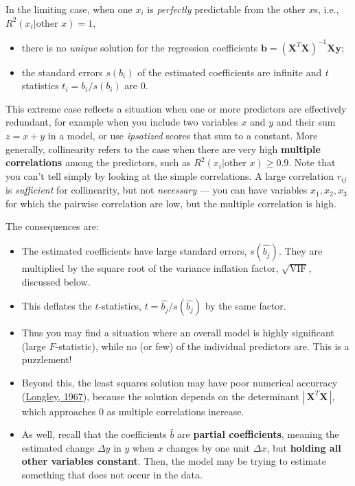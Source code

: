 \documentclass[
  letterpaper,
  10pt,
  krantz2]{krantz}
\providecommand{\tightlist}{%
  \setlength{\itemsep}{0pt}\setlength{\parskip}{0pt}}\usepackage{longtable,booktabs,array}
\begin{document}
In the limiting case, when one \(x_i\) is \emph{perfectly} predictable
from the other \(x\)s, i.e., \(R^2 (x_i | \text{other }x) = 1\),

\begin{itemize}
\tightlist
\item
  there is no \emph{unique} solution for the regression coefficients
  \(\mathbf{b} = (\mathbf{X}^T \mathbf{X})^{-1} \mathbf{X} \mathbf{y}\);
\item
  the standard errors \(s (b_i)\) of the estimated coefficients are
  infinite and \emph{t} statistics \(t_i = b_i / s (b_i)\) are 0.
\end{itemize}

This extreme case reflects a situation when one or more predictors are
effectively redundant, for example when you include two variables \(x\)
and \(y\) and their sum \(z = x + y\) in a model, or use
\emph{ipsatized} scores that sum to a constant. More generally,
collinearity refers to the case when there are very high
\textbf{multiple correlations} among the predictors, such as
\(R^2 (x_i | \text{other }x) \ge 0.9\). Note that you can't tell simply
by looking at the simple correlations. A large correlation \(r_{ij}\) is
\emph{sufficient} for collinearity, but not \emph{necessary} --- you can
have variables \(x_1, x_2, x_3\) for which the pairwise correlation are
low, but the multiple correlation is high.

The consequences are:

\begin{itemize}
\tightlist
\item
  The estimated coefficients have large standard errors,
  \(s(\hat{b_j})\). They are multiplied by the square root of the
  variance inflation factor, \(\sqrt{\text{VIF}}\), discussed below.
\item
  This deflates the \(t\)-statistics, \(t = \hat{b_j} / s(\hat{b_j})\)
  by the same factor.
\item
  Thus you may find a situation where an overall model is highly
  significant (large \(F\)-statistic), while no (or few) of the
  individual predictors are. This is a puzzlement!
\item
  Beyond this, the least squares solution may have poor numerical
  accurracy (\protect\hyperlink{ref-Longley:1967}{Longley, 1967}),
  because the solution depends on the determinant
  \(|\,\mathbf{X}^T \mathbf{X}\,|\), which approaches 0 as multiple
  correlations increase.
\item
  As well, recall that the coefficients \(\hat{b}\) are \textbf{partial
  coefficients}, meaning the estimated change \(\Delta y\) in \(y\) when
  \(x\) changes by one unit \(\Delta x\), but \textbf{holding all other
  variables constant}. Then, the model may be trying to estimate
  something that does not occur in the data.
\end{itemize}
\end{document}

